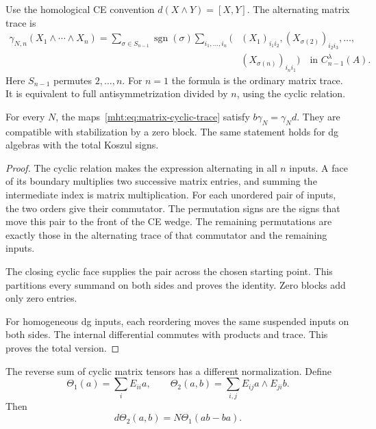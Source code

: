 Use the homological CE convention
$d(X\wedge Y)=[X,Y]$. The alternating matrix trace is
\begin{equation}\label{mht:eq:matrix-cyclic-trace}
 \begin{split}
 \gamma_{N,n}(X_1\wedge\cdots\wedge X_n)
   =\sum_{\sigma\in S_{n-1}}\operatorname{sgn}(\sigma)
     \sum_{i_1,\ldots,i_n}
     (&(X_1)_{i_1i_2},
       (X_{\sigma(2)})_{i_2i_3},\ldots,\\[-1mm]
      &(X_{\sigma(n)})_{i_ni_1})
       \quad\text{in }C^\lambda_{n-1}(A).
 \end{split}
\end{equation}
Here $S_{n-1}$ permutes $2,\ldots,n$. For $n=1$ the formula is
the ordinary matrix trace. It is equivalent to full
antisymmetrization divided by $n$, using the cyclic relation.

\begin{proposition}\label{mht:prop:matrix-trace-chain}
For every $N$, the maps~\eqref{mht:eq:matrix-cyclic-trace} satisfy
$b\gamma_N=\gamma_Nd$. They are compatible with stabilization by
a zero block. The same statement holds for dg algebras with the
total Koszul signs.
\end{proposition}

\begin{proof}
The cyclic relation makes the expression alternating in all
$n$ inputs. A face of its boundary multiplies two successive
matrix entries, and summing the intermediate index is matrix
multiplication. For each unordered pair of inputs, the two
orders give their commutator. The permutation signs are the
signs that move this pair to the front of the CE wedge. The
remaining permutations are exactly those in the alternating
trace of that commutator and the remaining inputs. 

The closing
cyclic face supplies the pair across the chosen starting point.
This partitions every summand on both sides and proves the
identity. Zero blocks add only zero entries. 

For homogeneous
dg inputs, each reordering moves the same suspended inputs on
both sides. The internal differential commutes with products
and trace. This proves the total version.
\end{proof}

The reverse sum of cyclic matrix tensors has a different
normalization. Define
\[
 \Theta_1(a)=\sum_i E_{ii}a,\qquad
 \Theta_2(a,b)=\sum_{i,j}E_{ij}a\wedge E_{ji}b.
\]
Then
\begin{equation}\label{mht:eq:raw-cyclic-rank-defect}
 d\Theta_2(a,b)=N\Theta_1(ab-ba).
\end{equation}


